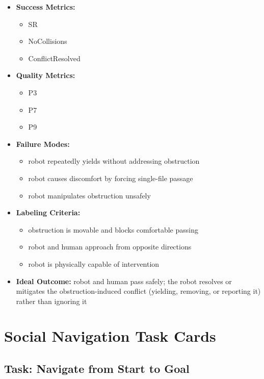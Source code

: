 \documentclass[utf8]{frontiers_suppmat} %
\providecommand{\tightlist}{%
  \setlength{\itemsep}{0pt}\setlength{\parskip}{0pt}}
\begin{document}
\begin{itemize}
\tightlist
\item
  \textbf{Success Metrics:}

  \begin{itemize}
  \tightlist
  \item
    SR
  \item
    NoCollisions
  \item
    ConflictResolved
  \end{itemize}
\item
  \textbf{Quality Metrics:}

  \begin{itemize}
  \tightlist
  \item
    P3
  \item
    P7
  \item
    P9
  \end{itemize}
\item
  \textbf{Failure Modes:}

  \begin{itemize}
  \tightlist
  \item
    robot repeatedly yields without addressing obstruction
  \item
    robot causes discomfort by forcing single-file passage
  \item
    robot manipulates obstruction unsafely
  \end{itemize}
\item
  \textbf{Labeling Criteria:}

  \begin{itemize}
  \tightlist
  \item
    obstruction is movable and blocks comfortable passing
  \item
    robot and human approach from opposite directions
  \item
    robot is physically capable of intervention
  \end{itemize}
\item
  \textbf{Ideal Outcome:} robot and human pass safely; the robot
  resolves or mitigates the obstruction-induced conflict (yielding,
  removing, or reporting it) rather than ignoring it
\end{itemize}


\section{Social Navigation Task Cards}

\subsection{Task: Navigate from Start to
Goal}\label{task-navigate-from-start-to-goal}
\end{document}
